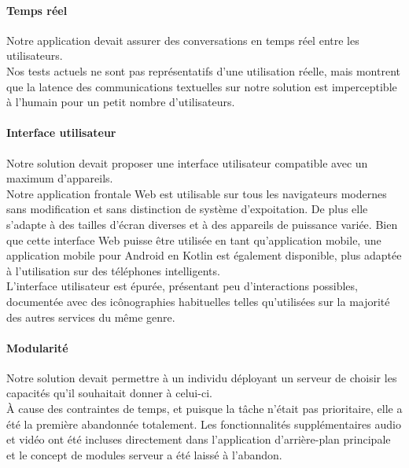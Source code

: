 \paragraph{Temps réel} Notre application devait assurer des conversations en temps réel entre les utilisateurs.\\
Nos tests actuels ne sont pas représentatifs d'une utilisation réelle, mais montrent que la latence des communications textuelles sur notre solution est imperceptible à l'humain pour un petit nombre d'utilisateurs.

\paragraph{Interface utilisateur} Notre solution devait proposer une interface utilisateur compatible avec un maximum d'appareils.\\
Notre application frontale Web est utilisable sur tous les navigateurs modernes sans modification et sans distinction de système d'expoitation. De plus elle s'adapte à des tailles d'écran diverses et à des appareils de puissance variée. Bien que cette interface Web puisse être utilisée en tant qu'application mobile, une application mobile pour Android en Kotlin est également disponible, plus adaptée à l'utilisation sur des téléphones intelligents.\\ %
L'interface utilisateur est épurée, présentant peu d'interactions possibles, documentée avec des icônographies habituelles telles qu'utilisées sur la majorité des autres services du même genre. %

\paragraph{Modularité} Notre solution devait permettre à un individu déployant un serveur de choisir les capacités qu'il souhaitait donner à celui-ci.\\
À cause des contraintes de temps, et puisque la tâche n'était pas prioritaire, elle a été la première abandonnée totalement. Les fonctionnalités supplémentaires audio et vidéo ont été incluses directement dans l'application d'arrière-plan principale et le concept de modules serveur a été laissé à l'abandon.

